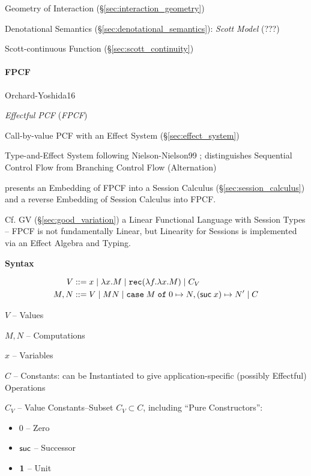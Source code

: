 Geometry of Interaction (\S\ref{sec:interaction_geometry})

Denotational Semantics (\S\ref{sec:denotational_semantics}):
\emph{Scott Model} (???)

Scott-continuous Function (\S\ref{sec:scott_continuity})



\paragraph{FPCF}\label{sec:fpcf}\hfill

Orchard-Yoshida16 \cite{orchard-yoshida16}

\emph{Effectful PCF} (\emph{FPCF})

Call-by-value PCF with an Effect System (\S\ref{sec:effect_system})

\fist Type-and-Effect System following Nielson-Nielson99
\cite{nielson-nielson99}; distinguishes Sequential Control Flow from
Branching Control Flow (Alternation)

\fist \cite{orchard-yoshida16} presents an Embedding of FPCF into a
Session Calculus (\S\ref{sec:session_calculus}) and a reverse
Embedding of Session Calculus into FPCF.

\fist Cf. GV (\S\ref{sec:good_variation}) a Linear Functional Language
with Session Types \cite{wadler12} -- FPCF is not fundamentally
Linear, but Linearity for Sessions is implemented via an Effect
Algebra and Typing.

\textbf{Syntax}

\begin{align*}
  V &::= x \mid \lambda x.M \mid \mathtt{rec}(\lambda f.\lambda x.M)
    \mid C_V \\
  M,N &::= V \mid M N \mid \mathtt{case}\; M \;\mathtt{of}\; 0 \mapsto N,
    (\mathsf{suc}\; x) \mapsto N' \mid C
\end{align*}

$V$ -- Values

$M,N$ -- Computations

$x$ -- Variables

$C$ -- Constants: can be Instantiated to give application-specific
(possibly Effectful) Operations %

$C_V$ -- Value Constants--Subset $C_V \subset C$, including
``Pure Constructors'': %
\begin{itemize}
  \item $0$ -- Zero
  \item $\mathsf{suc}$ -- Successor
  \item $\mathbf{1}$ -- Unit
\end{itemize}


